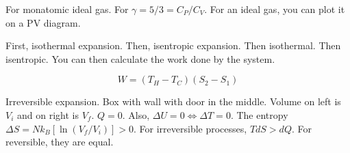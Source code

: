 \documentclass{article}
\newtheorem{one minute paper}[theorem]{One Minute Paper}
\begin{document}
For monatomic ideal gas. For $\gamma = 5/3 = C_P/C_V$. For an ideal gas, you can plot it on a PV diagram. 

First, isothermal expansion. Then, isentropic expansion. Then isothermal. Then isentropic. You can then calculate the work done by the system.

\begin{equation}
    W = (T_H - T_C)(S_2 - S_1)
\end{equation}

Irreversible expansion. Box with wall with door in the middle. Volume on left is $V_i$ and on right is $V_f$. $Q = 0$. Also, $\Delta U = 0 \iff \Delta T =0$.
The entropy $\Delta S = Nk_B\left[ \ln\left( V_f/V_i \right) \right] > 0$. For irreversible processes, $T dS > dQ$. For reversible, they are equal. 
\end{document}
